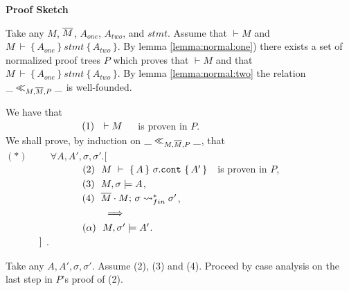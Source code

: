 \noindent
\vspace{.2cm}
  {\textbf{Proof Sketch}} 

Take any $M$, $\overline{M}$, $A_{one}$, $A_{two}$, and $stmt$. Assume that $\vdash M$  and 
$M\ \vdash\  \{\, A_{one} \,  \}\ stmt\  \{\, A_{two} \, \}$.
By lemma  \ref{lemma:normal:one}) there exists a set of normalized 
proof trees $P$ which proves that $\vdash M$ and that $M\ \vdash\  \{\, A_{one} \,  \}\ stmt\  \{\, A_{two}\, \}$.
By lemma \ref{lemma:normal:two} the relation $\_ \ll_{M,\overline{M},P}  \_$ is well-founded.
 
 We have that \\
 $\strut \ \ \hspace{2.3cm} \ \ (1) \ \ \vdash M $\ \ \  is proven in $P$.
 \\ 
We shall prove,  by induction on $\_ \ll_{M,\overline{M},P}  \_$, that 
\\ 
$(*) \hspace{1cm} \forall A, A', \sigma, \sigma'.[$\\
$\strut \ \ \hspace{2.3cm} \ \ (2) \ \ M\ \vdash\  \{\, A \,  \}\ \sigma.\prg{cont}\  \{\, A' \, \}\ \ $ is proven in $P$,\\
$\strut \ \ \hspace{2.3cm} \ \ (3) \ \ M, \sigma \models A$, \\
$\strut \ \ \hspace{2.3cm} \ \ (4) \ \ \leadstoBoundedStarFin {\Mtwo\cdot M}  {\sigma}  {\sigma'}$,\\
$\strut \ \ \hspace{2.3cm} \ \ \ \ \ \ \ \ \ \Longrightarrow$\\
$\strut  \ \ \hspace{2.3cm} \ \ (\alpha)\ \  M, \sigma' \models A'$.\\
$\strut \ \   \hspace{1cm} ]$
.

\vspace{.1cm}
\noindent
Take any $A, A', \sigma, \sigma'$. Assume  (2), (3) and (4).
Proceed by case analysis on the last step in $P$'s proof of (2).


